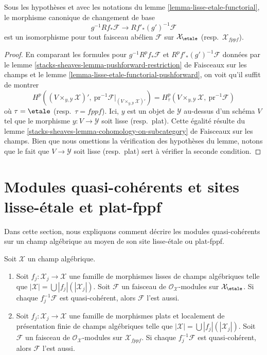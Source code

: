 \begin{lemma}
\label{lemma-lisse-etale-functorial-cohomology}
Sous les hypothèses et avec les notations du lemme
\ref{lemma-lisse-etale-functorial}, le morphisme canonique de changement de base
$$
g^{-1}Rf_*\mathcal{F} \longrightarrow Rf'_*(g')^{-1}\mathcal{F}
$$
est un isomorphisme pour tout faisceau abélien $\mathcal{F}$
sur $\mathcal{X}_\etale$ (resp.\ $\mathcal{X}_{fppf}$).
\end{lemma}

\begin{proof}
En comparant les formules pour $g^{-1}R^pf_*\mathcal{F}$
et $R^pf'_*(g')^{-1}\mathcal{F}$ données par le
lemme \ref{stacks-sheaves-lemma-pushforward-restriction} de Faisceaux sur les champs
et le lemme \ref{lemma-lisse-etale-functorial-pushforward},
on voit qu'il suffit de montrer
$$
H^p((V \times_{y, \mathcal{Y}} \mathcal{X})',
\ \text{pr}^{-1}\mathcal{F}|_{(V \times_{y, \mathcal{Y}} \mathcal{X})'})
=
H^p_\tau(V \times_{y, \mathcal{Y}} \mathcal{X},\ \text{pr}^{-1}\mathcal{F})
$$
où $\tau = \etale$ (resp.\ $\tau = fppf$). Ici, $y$ est un objet
de $\mathcal{Y}$ au-dessus d'un schéma $V$ tel que le morphisme
$y : V \to \mathcal{Y}$ soit lisse (resp.\ plat).
Cette égalité résulte du
lemme \ref{stacks-sheaves-lemma-cohomology-on-subcategory} de Faisceaux sur les champs.
Bien que nous omettions la vérification des hypothèses
du lemme, notons que le fait que $V \to \mathcal{Y}$ soit lisse
(resp.\ plat) sert à vérifier la seconde condition.
\end{proof}






\section{Modules quasi-cohérents et sites lisse-étale et plat-fppf}
\label{section-quasi-coherent-modules-II}

\noindent
Dans cette section, nous expliquons comment décrire les modules quasi-cohérents
sur un champ algébrique au moyen de son site lisse-étale ou plat-fppf.

\begin{lemma}
\label{lemma-check-qc-on-etale-covering}
Soit $\mathcal{X}$ un champ algébrique.
\begin{enumerate}
\item Soit $f_j : \mathcal{X}_j \to \mathcal{X}$ une famille de morphismes
lisses de champs algébriques telle que
$|\mathcal{X}| =\bigcup |f_j|(|\mathcal{X}_j|)$.
Soit $\mathcal{F}$ un faisceau de $\mathcal{O}_\mathcal{X}$-modules
sur $\mathcal{X}_\etale$. Si chaque $f_j^{-1}\mathcal{F}$ est
quasi-cohérent, alors $\mathcal{F}$ l'est aussi.
\item Soit $f_j : \mathcal{X}_j \to \mathcal{X}$ une famille de morphismes
plats et localement de présentation finie de champs algébriques telle que
$|\mathcal{X}| =\bigcup |f_j|(|\mathcal{X}_j|)$.
Soit $\mathcal{F}$ un faisceau de $\mathcal{O}_\mathcal{X}$-modules
sur $\mathcal{X}_{fppf}$. Si chaque $f_j^{-1}\mathcal{F}$ est
quasi-cohérent, alors $\mathcal{F}$ l'est aussi.
\end{enumerate}
\end{lemma}

